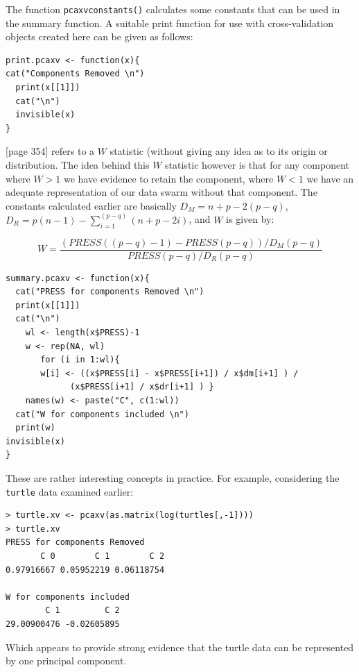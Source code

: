 The function \verb+pcaxvconstants()+ calculates some constants that can be used in the summary function.   A suitable print function for use with cross-validation objects created here can be given as follows:

\singlespacing
\begin{verbatim}
print.pcaxv <- function(x){
cat("Components Removed \n")
  print(x[[1]])
  cat("\n")
  invisible(x)
}
\end{verbatim}
\onehalfspacing

[page 354] \cite{Jackson:1991} refers to a $W$ statistic (without giving any idea as to its origin or distribution.   The idea behind this $W$ statistic however is that for any component where $W > 1$ we have evidence to retain the component, where $W < 1$ we have an adequate representation of our data swarm without that component.   The constants calculated earlier are basically $D_{M} = n + p - 2(p-q)$, $D_{R} = p (n - 1) - \sum_{i=1}^{(p-q)}(n + p - 2i)$, and $W$ is given by:

\begin{equation}
W = \frac{ (PRESS((p-q)-1) - PRESS(p-q))/D_{M}(p-q)}{PRESS(p-q)/D_{R}(p-q)}
\end{equation}

\singlespacing
\begin{verbatim}
summary.pcaxv <- function(x){
  cat("PRESS for components Removed \n")
  print(x[[1]])
  cat("\n")
    wl <- length(x$PRESS)-1
    w <- rep(NA, wl)
       for (i in 1:wl){
       w[i] <- ((x$PRESS[i] - x$PRESS[i+1]) / x$dm[i+1] ) / 
             (x$PRESS[i+1] / x$dr[i+1] ) }
    names(w) <- paste("C", c(1:wl))
  cat("W for components included \n")
  print(w)
invisible(x)
}
\end{verbatim}
\onehalfspacing


These are rather interesting concepts in practice.   For example, considering the \verb+turtle+ data examined earlier:

\singlespacing
\begin{verbatim}
> turtle.xv <- pcaxv(as.matrix(log(turtles[,-1])))
> turtle.xv
PRESS for components Removed 
       C 0        C 1        C 2 
0.97916667 0.05952219 0.06118754 

W for components included 
        C 1         C 2 
29.00900476 -0.02605895 
\end{verbatim}
\onehalfspacing

Which appears to provide strong evidence that the turtle data can be represented by one principal component.

